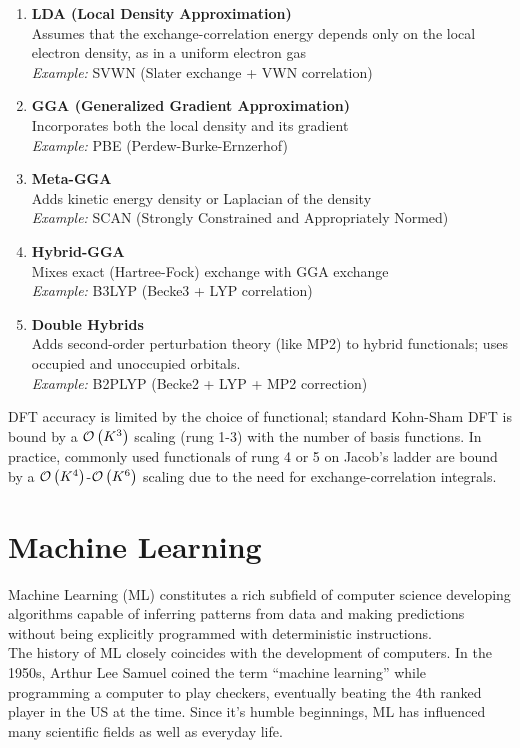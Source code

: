 \begin{enumerate}
    \item \textbf{LDA (Local Density Approximation)}\\
    Assumes that the exchange-correlation energy depends only on the local electron density, as in a uniform electron gas\\
    \textit{Example:} SVWN (Slater exchange + VWN correlation) \parencite{ref:slater1951, ref:vwn1980}

    \item \textbf{GGA (Generalized Gradient Approximation)}\\
    Incorporates both the local density and its gradient\\
    \textit{Example:} PBE (Perdew-Burke-Ernzerhof) \parencite{ref:perdew1996}

    \item \textbf{Meta-GGA}\\
    Adds kinetic energy density or Laplacian of the density\\
    \textit{Example:} SCAN (Strongly Constrained and Appropriately Normed) \parencite{ref:scan2015}

    \item \textbf{Hybrid-GGA}\\
    Mixes exact (Hartree-Fock) exchange with GGA exchange\\
    \textit{Example:} B3LYP (Becke3 + LYP correlation) \parencite{ref:lee_yang_parr_1988, ref:becke_1993}

    \item \textbf{Double Hybrids}\\
    Adds second-order perturbation theory (like MP2) to hybrid functionals; uses occupied and unoccupied orbitals.\\
    \textit{Example:} B2PLYP (Becke2 + LYP + MP2 correction) \parencite{ref:grimme2006}
\end{enumerate}
DFT accuracy is limited by the choice of functional; standard Kohn-Sham DFT is bound by a $\mathcal{O}\left(K^3\right)$ scaling (rung 1-3) with the number of basis functions. In practice, commonly used functionals of rung 4 or 5 on Jacob's ladder are bound by a $\mathcal{O}\left(K^4\right)$-$\mathcal{O}\left(K^6\right)$ scaling due to the need for exchange-correlation integrals.


\section{Machine Learning}
\label{sec:background_ml}
Machine Learning (ML) constitutes a rich subfield of computer science developing algorithms capable of inferring patterns from data and making predictions without being explicitly programmed with deterministic instructions. \\
The history of ML closely coincides with the development of computers. In the 1950s, Arthur Lee Samuel coined the term ``machine learning'' while programming a computer to play checkers, eventually beating the 4th ranked player in the US at the time. \parencite{ref:knuth1989comments} Since it's humble beginnings, ML has influenced many scientific fields as well as everyday life.\\

